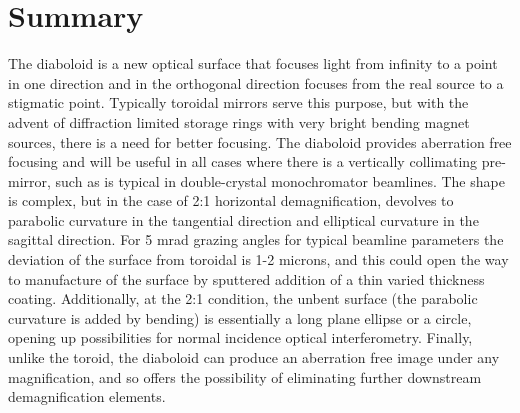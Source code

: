 \documentclass{iucr}              %
\begin{document}



\section{Summary}
\label{sec:summary}

The diaboloid is a new optical surface that focuses light from infinity to a point in one direction and in the orthogonal direction focuses from the real source to a stigmatic point.  Typically toroidal mirrors serve this purpose, but with the advent of diffraction limited storage rings with very bright bending magnet sources, there is a need for better focusing. The diaboloid provides aberration free focusing and will be useful in all cases where there is a vertically collimating pre-mirror, such as is typical in double-crystal monochromator beamlines. The shape is complex, but in the case of 2:1 horizontal demagnification, devolves to parabolic curvature in the tangential direction and elliptical curvature in the sagittal direction. For 5 mrad grazing angles for typical beamline parameters the deviation of the surface from toroidal is 1-2 microns, and this could open the way to manufacture of the surface by sputtered addition of a thin varied thickness coating.  Additionally, at the 2:1 condition, the unbent surface (the parabolic curvature is added by bending) is essentially a long plane ellipse or a circle, opening up possibilities for normal incidence optical interferometry.  Finally, unlike the toroid, the diaboloid can produce an aberration free image under any magnification, and so offers the possibility of eliminating further downstream demagnification elements. 
\end{document}
